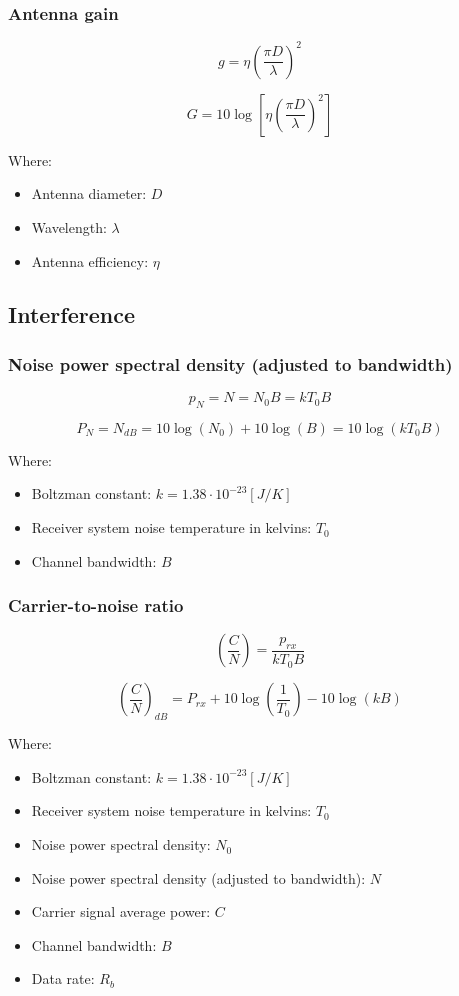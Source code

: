 \documentclass[../main.tex]{subfiles}
\begin{document}
\subsubsection{Antenna gain}

$$
	g = \eta \left( \frac {\pi D} {\lambda} \right)^2
$$

$$
	G = 10 \log \left[ \eta \left( \frac {\pi D} {\lambda} \right)^2 \right]
$$

Where:

\begin{itemize}
	\item Antenna diameter: $D$
	\item Wavelength: $\lambda$
	\item Antenna efficiency: $\eta$
\end{itemize}

\subsection{Interference}

\subsubsection{Noise power spectral density (adjusted to bandwidth)}

$$
	p_N = N = N_0 B = k T_0 B
$$

$$
	P_N = N_{dB} = 10 \log (N_0) + 10 \log (B) = 10 \log (k T_0 B)
$$

Where:

\begin{itemize}
	\item Boltzman constant: $k = 1.38 \cdot 10^{-23} [J/K]$
	\item Receiver system noise temperature in kelvins: $T_0$
	\item Channel bandwidth: $B$
\end{itemize}

\subsubsection{Carrier-to-noise ratio}

$$
	\left( \frac {C} {N} \right) = \frac {p_{rx}} {k T_0 B}
$$

$$
	\left( \frac {C} {N} \right)_{dB} = P_{rx} + 10 \log \left( \frac {1} {T_0} \right) - 10 \log (k B)
$$

Where:

\begin{itemize}
	\item Boltzman constant: $k = 1.38 \cdot 10^{-23} [J/K]$
	\item Receiver system noise temperature in kelvins: $T_0$
	\item Noise power spectral density: $N_0$
	\item Noise power spectral density (adjusted to bandwidth): $N$
	\item Carrier signal average power: $C$
	\item Channel bandwidth: $B$
	\item Data rate: $R_b$
\end{itemize}
\end{document}
